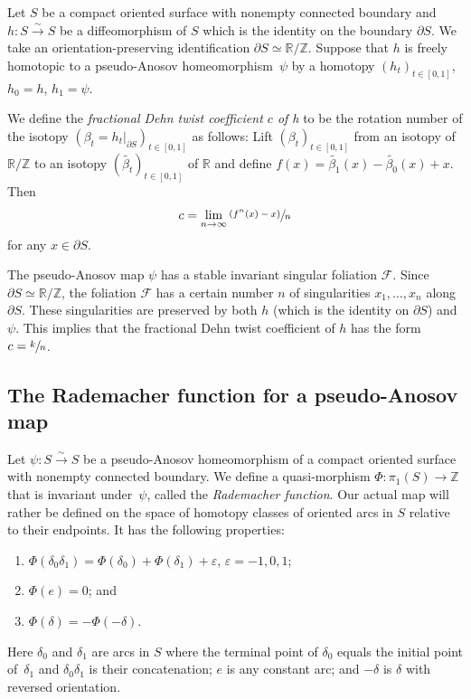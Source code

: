 \documentclass[10pt]{amsart}
\let\mathcal\mathscr
\let\epsilon\varepsilon
\newcommand{\psfrac}[2]{\sfrac{(#1)}{#2}}
\newcommand{\isom}{\stackrel\sim\longrightarrow}
\theoremstyle{plain}
\theoremstyle{definition}
\numberwithin{equation}{subsection}
\newcommand{\RR}{\mathbb{R}}
\newcommand{\ZZ}{\mathbb{Z}}
\newcommand{\cF}{\mathcal{F}}
\newcommand{\bdry}{\partial}
\newcommand{\be}{\begin{enumerate}}
\newcommand{\ee}{\end{enumerate}}
\begin{document}
Let $S$ be a compact oriented surface with nonempty connected boundary and $h: S\isom S$ be a diffeomorphism of $S$ which is the identity on the boundary $\partial S$. We take an orientation-preserving identification $\partial S \simeq\RR/\ZZ$. Suppose that $h$ is freely homotopic to a pseudo-Anosov homeomorphism~$\psi$ by a homotopy $(h_t)_{t\in [0,1]}$, $h_0 =h$, $h_1 =\psi$.

We define the {\em fractional Dehn twist coefficient $c$ of h} to be the rotation number of the isotopy $(\beta_t =h_t \vert_{\partial S})_{t\in [0,1]}$ as follows: Lift $(\beta_t)_{t\in [0,1]}$ from an isotopy of $\RR /\ZZ$ to an isotopy $(\widetilde{\beta_t})_{t\in [0,1]}$ of $\RR$ and define $f(x) =\widetilde{\beta_1} (x) -\widetilde{\beta_0} (x)+x$. Then
$$c=\lim_{n\to \infty} \psfrac{f^n(x)-x}{n}$$
for any $x\in \bdry S$.

The pseudo-Anosov map $\psi$ has a stable invariant singular foliation $\cF$. Since $\partial S\simeq \RR/\ZZ$, the foliation $\cF$ has a certain number $n$ of singularities $x_1,\dots,x_n$ along $\partial S$. These singularities are preserved by both $h$ (which is the identity on $\partial S$) and $\psi$. This implies that the fractional Dehn twist coefficient of $h$ has the form $c=\sfrac{k}{n}$.

\subsection{The Rademacher function for a pseudo-Anosov map} \label{subsection: Rademacher function}

Let $\psi : S\isom S$ be a pseudo-Anosov homeomorphism of a compact oriented surface with nonempty connected boundary. We define a quasi-morphism $\Phi: \pi_1(S) \to \ZZ$ that is invariant under~$\psi$, called the {\em Rademacher function}. Our actual map will rather be defined on the space of homotopy classes of oriented arcs in $S$ relative to their endpoints. It has the following properties:
\be\renewcommand{\theenumi}{R\arabic{enumi}}
\item\label{enum:R1}
$\Phi (\delta_0 \delta_1) =\Phi (\delta_0)+\Phi (\delta_1)+\epsilon$, $\epsilon =-1,0,1$;
\item\label{enum:R2}
$\Phi (e)=0$; and
\item\label{enum:R3}
$\Phi (\delta)=-\Phi (-\delta)$.
\ee
Here $\delta_0$ and $\delta_1$ are arcs in $S$ where the terminal point of $\delta_0$ equals the initial point of~$\delta_1$ and $\delta_0 \delta_1$ is their concatenation; $e$ is any constant arc; and $-\delta$ is $\delta$ with reversed orientation.
\end{document}
